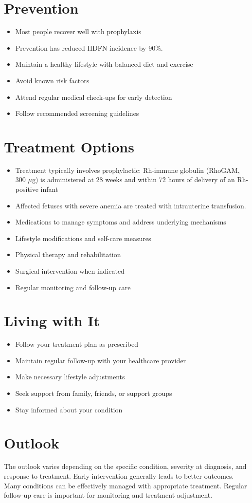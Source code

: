 \section{Prevention}
\begin{itemize}[noitemsep]
  \item Most people recover well with prophylaxis
  \item Prevention has reduced HDFN incidence by 90\%.
  \item Maintain a healthy lifestyle with balanced diet and exercise
  \item Avoid known risk factors
  \item Attend regular medical check-ups for early detection
  \item Follow recommended screening guidelines
\end{itemize}
\section{Treatment Options}
\begin{itemize}[noitemsep]
  \item Treatment typically involves prophylactic: Rh-immune globulin (RhoGAM, 300 $\mu$g) is administered at 28 weeks and within 72 hours of delivery of an Rh-positive infant
  \item Affected fetuses with severe anemia are treated with intrauterine transfusion.
  \item Medications to manage symptoms and address underlying mechanisms
  \item Lifestyle modifications and self-care measures
  \item Physical therapy and rehabilitation
  \item Surgical intervention when indicated
  \item Regular monitoring and follow-up care
\end{itemize}
\section{Living with It}
\begin{itemize}[noitemsep]
  \item Follow your treatment plan as prescribed
  \item Maintain regular follow-up with your healthcare provider
  \item Make necessary lifestyle adjustments
  \item Seek support from family, friends, or support groups
  \item Stay informed about your condition
\end{itemize}
\section{Outlook}
The outlook varies depending on the specific condition, severity at diagnosis, and response to treatment. Early intervention generally leads to better outcomes. Many conditions can be effectively managed with appropriate treatment. Regular follow-up care is important for monitoring and treatment adjustment.
